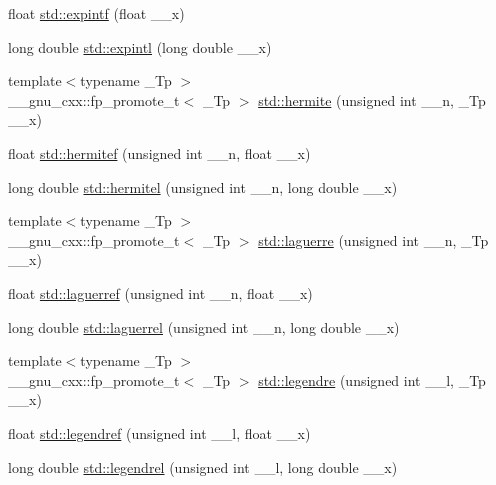 \begin{DoxyCompactItemize}
\item 
float \hyperlink{group__cxx17__math__spec__func_ga5842816f6eed2594e0a327df4e4a2a47}{std\+::expintf} (float \+\_\+\+\_\+x)
\item 
long double \hyperlink{group__cxx17__math__spec__func_ga1329130b32328d0666e290ee5931fa4f}{std\+::expintl} (long double \+\_\+\+\_\+x)
\item 
{\footnotesize template$<$typename \+\_\+\+Tp $>$ }\\\+\_\+\+\_\+gnu\+\_\+cxx\+::fp\+\_\+promote\+\_\+t$<$ \+\_\+\+Tp $>$ \hyperlink{group__cxx17__math__spec__func_ga8bd1626f1e3f7256c4fd13579f881183}{std\+::hermite} (unsigned int \+\_\+\+\_\+n, \+\_\+\+Tp \+\_\+\+\_\+x)
\item 
float \hyperlink{group__cxx17__math__spec__func_ga94dae7444bb349e33057a92932db8abe}{std\+::hermitef} (unsigned int \+\_\+\+\_\+n, float \+\_\+\+\_\+x)
\item 
long double \hyperlink{group__cxx17__math__spec__func_ga21f8e312ee3e65286f86bf141b0f32e0}{std\+::hermitel} (unsigned int \+\_\+\+\_\+n, long double \+\_\+\+\_\+x)
\item 
{\footnotesize template$<$typename \+\_\+\+Tp $>$ }\\\+\_\+\+\_\+gnu\+\_\+cxx\+::fp\+\_\+promote\+\_\+t$<$ \+\_\+\+Tp $>$ \hyperlink{group__cxx17__math__spec__func_ga9d7b24a11dad27690387405548973ef9}{std\+::laguerre} (unsigned int \+\_\+\+\_\+n, \+\_\+\+Tp \+\_\+\+\_\+x)
\item 
float \hyperlink{group__cxx17__math__spec__func_gada763419b0e21b38e38daa8b6eb56a8c}{std\+::laguerref} (unsigned int \+\_\+\+\_\+n, float \+\_\+\+\_\+x)
\item 
long double \hyperlink{group__cxx17__math__spec__func_gaaf8b141edf9163b37ea4f2ed3e0191fc}{std\+::laguerrel} (unsigned int \+\_\+\+\_\+n, long double \+\_\+\+\_\+x)
\item 
{\footnotesize template$<$typename \+\_\+\+Tp $>$ }\\\+\_\+\+\_\+gnu\+\_\+cxx\+::fp\+\_\+promote\+\_\+t$<$ \+\_\+\+Tp $>$ \hyperlink{group__cxx17__math__spec__func_gad06811f4e139b0ba84235c1f0d34d86e}{std\+::legendre} (unsigned int \+\_\+\+\_\+l, \+\_\+\+Tp \+\_\+\+\_\+x)
\item 
float \hyperlink{group__cxx17__math__spec__func_gaed94e3c664c99f5204da75be75aeac21}{std\+::legendref} (unsigned int \+\_\+\+\_\+l, float \+\_\+\+\_\+x)
\item 
long double \hyperlink{group__cxx17__math__spec__func_ga1b39bc22e3cc4860d08eb54099460391}{std\+::legendrel} (unsigned int \+\_\+\+\_\+l, long double \+\_\+\+\_\+x)

\end{DoxyCompactItemize}
